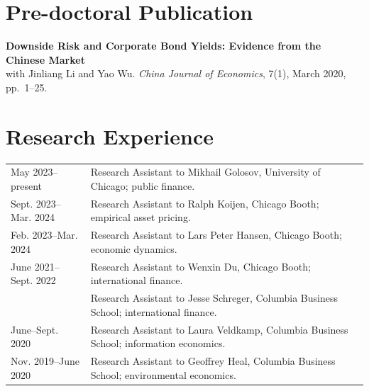 \documentclass[11pt,letterpaper]{article}
\renewcommand{\arraystretch}{1.1}
\newenvironment{sectionbody}{%
  \begin{list}{}{\setlength{\leftmargin}{0.18in}\setlength{\rightmargin}{0pt}%
    \setlength{\topsep}{0pt}\setlength{\partopsep}{0pt}%
    \setlength{\parsep}{3pt}\setlength{\itemsep}{0pt}}\item[]%
}{\end{list}}
\begin{document}
\section*{Pre-doctoral Publication}
\begin{sectionbody}
  \textbf{Downside Risk and Corporate Bond Yields: Evidence from the Chinese Market}\\
  with Jinliang Li and Yao Wu. \textit{China Journal of Economics}, 7(1),
  March 2020, pp.~1--25.
\end{sectionbody}

\section*{Research Experience}
\begin{sectionbody}
  \renewcommand{\arraystretch}{1.0}
  \begin{tabularx}{\linewidth}{@{}>{\raggedright\arraybackslash}p{1.35in}X@{}}
    May 2023--present & Research Assistant to Mikhail Golosov, University of Chicago;
      public finance.\\[1pt]
    Sept. 2023--Mar. 2024 & Research Assistant to Ralph Koijen, Chicago Booth;
      empirical asset pricing.\\[1pt]
    Feb. 2023--Mar. 2024 & Research Assistant to Lars Peter Hansen, Chicago Booth;
      economic dynamics.\\[1pt]
    June 2021--Sept. 2022 & Research Assistant to Wenxin Du, Chicago Booth;
      international finance.\\[1pt]
    2020 & Research Assistant to Jesse Schreger, Columbia Business School;
      international finance.\\[1pt]
    June--Sept. 2020 & Research Assistant to Laura Veldkamp, Columbia Business School;
      information economics.\\[1pt]
    Nov. 2019--June 2020 & Research Assistant to Geoffrey Heal, Columbia Business School;
      environmental economics.
  \end{tabularx}
\end{sectionbody}

\newpage
\end{document}
